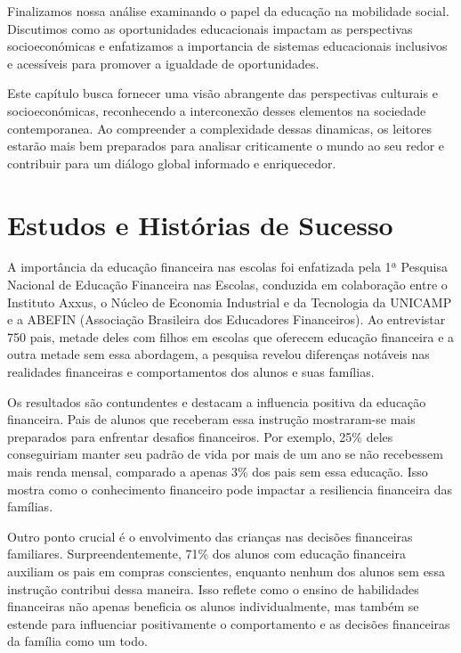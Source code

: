 \documentclass{report}
\begin{document}
Finalizamos nossa análise examinando o papel da educação na mobilidade social. Discutimos como as oportunidades educacionais impactam as perspectivas socioeconómicas e enfatizamos a importancia de sistemas educacionais inclusivos e acessíveis para promover a igualdade de oportunidades.

Este capítulo busca fornecer uma visão abrangente das perspectivas culturais e socioeconómicas, reconhecendo a interconexão desses elementos na sociedade contemporanea. Ao compreender a complexidade dessas dinamicas, os leitores estarão mais bem preparados para analisar criticamente o mundo ao seu redor e contribuir para um diálogo global informado e enriquecedor.

\chapter{Estudos e Histórias de Sucesso}
\label{chap.Estudos e Histórias de Sucesso}

A importância da educação financeira nas escolas foi enfatizada pela 1ª Pesquisa Nacional de Educação Financeira nas Escolas, conduzida em colaboração entre o Instituto Axxus, o Núcleo de Economia Industrial e da Tecnologia da UNICAMP e a ABEFIN (Associação Brasileira dos Educadores Financeiros). Ao entrevistar 750 pais, metade deles com filhos em escolas que oferecem educação financeira e a outra metade sem essa abordagem, a pesquisa revelou diferenças notáveis nas realidades financeiras e comportamentos dos alunos e suas famílias.

Os resultados são contundentes e destacam a influencia positiva da educação financeira. Pais de alunos que receberam essa instrução mostraram-se mais preparados para enfrentar desafios financeiros. Por exemplo, 25\% deles conseguiriam manter seu padrão de vida por mais de um ano se não recebessem mais renda mensal, comparado a apenas 3\% dos pais sem essa educação. Isso mostra como o conhecimento financeiro pode impactar a resiliencia financeira das famílias.

Outro ponto crucial é o envolvimento das crianças nas decisões financeiras familiares. Surpreendentemente, 71\% dos alunos com educação financeira auxiliam os pais em compras conscientes, enquanto nenhum dos alunos sem essa instrução contribui dessa maneira. Isso reflete como o ensino de habilidades financeiras não apenas beneficia os alunos individualmente, mas também se estende para influenciar positivamente o comportamento e as decisões financeiras da família como um todo.
\end{document}
